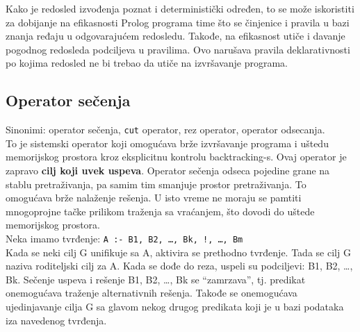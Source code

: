 \documentclass[../main.tex]{subfiles}
\begin{document}
\begin{boxprimer}
\begin{example}
{%
}
\end{example}
\end{boxprimer}

Kako je redosled izvođenja poznat i deterministički određen, to se može iskoristiti za dobijanje na efikasnosti Prolog programa time što se činjenice i pravila u bazi znanja ređaju u odgovarajućem redosledu. Takođe, na efikasnost utiče i davanje pogodnog redosleda podciljeva u pravilima. Ovo narušava pravila deklarativnosti po kojima redosled ne bi trebao da utiče na izvršavanje programa.

\subsection{Operator sečenja}
Sinonimi: operator sečenja, \texttt{cut} operator, rez operator, operator odsecanja.\\
To je sistemski operator koji omogućava brže izvršavanje programa i uštedu memorijskog prostora kroz eksplicitnu kontrolu backtracking-s. Ovaj operator je zapravo {\bf cilj koji uvek uspeva}. Operator sečenja odseca pojedine grane na stablu pretraživanja, pa samim tim smanjuje prostor pretraživanja. To omogućava brže nalaženje rešenja. U isto vreme ne moraju se pamtiti mnogoprojne tačke prilikom traženja sa vraćanjem, što dovodi do uštede memorijskog prostora.
\\
Neka imamo tvrđenje: \texttt{A :- B1, B2, \ldots, Bk, !, \ldots, Bm}\\
Kada se neki cilj G unifikuje sa A, aktivira se prethodno tvrđenje. Tada se cilj G naziva roditeljski cilj za A. Kada se dođe do reza, uspeli su podciljevi: B1, B2, \ldots, Bk. Sečenje uspeva i rešenje B1, B2, \ldots, Bk se ``zamrzava'', tj. predikat onemogućava traženje alternativnih rešenja. Takođe se onemogućava ujedinjavanje cilja G sa glavom nekog drugog predikata koji je u bazi podataka iza navedenog tvrđenja.
 
\end{document}
